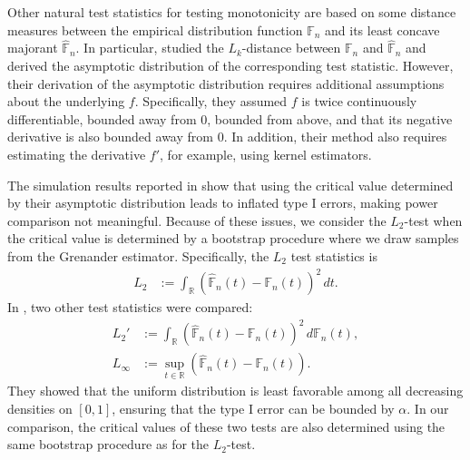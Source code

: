 \documentclass[12pt,letterpaper, twoside, openany]{article}
\theoremstyle{plain}
\begin{document}
%
Other natural test statistics for testing monotonicity are based on some distance measures between the empirical distribution function $\mathbb{F}_n$ and its least concave majorant $\hat{\mathbb{F}}_n$. In particular, \cite{kulikov2004testing} studied the $L_k$-distance between $\mathbb{F}_n$ and $\hat{\mathbb{F}}_n$ and derived the asymptotic distribution of the corresponding test statistic. However, their derivation of the asymptotic distribution requires additional assumptions about the underlying $f$. Specifically, they assumed $f$ is twice continuously differentiable, bounded away from $0$, bounded from above, and that its negative derivative is also bounded away from $0$. In addition, their method also requires estimating the derivative $f'$, for example, using kernel estimators. 

The simulation results reported in \cite{kulikov2004testing} show that using the critical value determined by their asymptotic distribution leads to inflated type I errors, making power comparison not meaningful. Because of these issues, we consider the $L_2$-test when the critical value is determined by a bootstrap procedure where we draw samples from the Grenander estimator. Specifically, the $L_2$ test statistics is
\begin{align*}
    L_2 &:= \int_{\mathbb{R}} (\hat{\mathbb{F}}_n(t) - \mathbb{F}_n(t))^2 \, dt.
\end{align*}
In \cite{kulikov2004testing}, two other test statistics were compared:
\begin{align*}
L_2' &:= \int_{\mathbb{R}} (\hat{\mathbb{F}}_n(t) - \mathbb{F}_n(t))^2 \, d \mathbb{F}_n(t),\\
    L_\infty  &:= \sup_{t \in \mathbb{R}} (\hat{\mathbb{F}}_n(t) - \mathbb{F}_n(t)).
\end{align*}
They showed that the uniform distribution is least favorable among all decreasing densities on $[0,1]$, ensuring that the type I error can be bounded by $\alpha$. In our comparison, the critical values of these two tests are also determined using the same bootstrap procedure as for the $L_2$-test.
\end{document}
